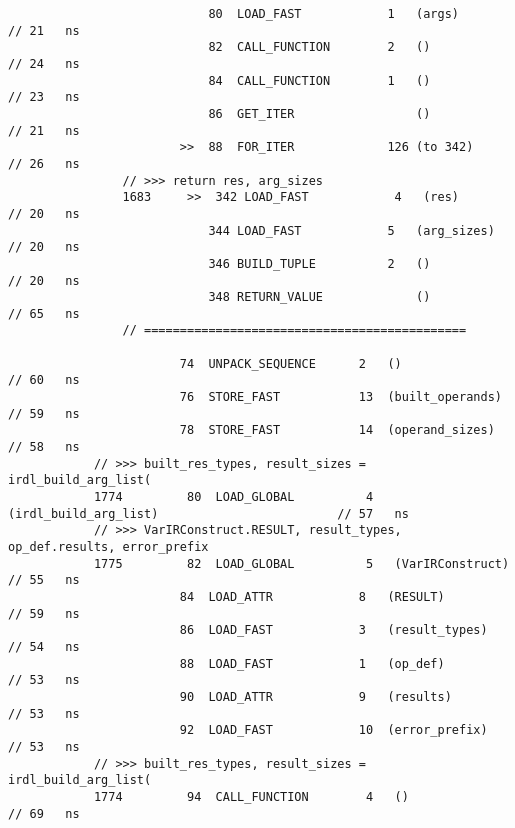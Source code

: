 \begin{code}
\begin{verbatim}
                            80  LOAD_FAST            1   (args)                                     // 21   ns
                            82  CALL_FUNCTION        2   ()                                         // 24   ns
                            84  CALL_FUNCTION        1   ()                                         // 23   ns
                            86  GET_ITER                 ()                                         // 21   ns
                        >>  88  FOR_ITER             126 (to 342)                                   // 26   ns
                // >>> return res, arg_sizes
                1683     >>  342 LOAD_FAST            4   (res)                                     // 20   ns
                            344 LOAD_FAST            5   (arg_sizes)                                // 20   ns
                            346 BUILD_TUPLE          2   ()                                         // 20   ns
                            348 RETURN_VALUE             ()                                         // 65   ns
                // =============================================

                        74  UNPACK_SEQUENCE      2   ()                                             // 60   ns
                        76  STORE_FAST           13  (built_operands)                               // 59   ns
                        78  STORE_FAST           14  (operand_sizes)                                // 58   ns
            // >>> built_res_types, result_sizes = irdl_build_arg_list(
            1774         80  LOAD_GLOBAL          4   (irdl_build_arg_list)                         // 57   ns
            // >>> VarIRConstruct.RESULT, result_types, op_def.results, error_prefix
            1775         82  LOAD_GLOBAL          5   (VarIRConstruct)                              // 55   ns
                        84  LOAD_ATTR            8   (RESULT)                                       // 59   ns
                        86  LOAD_FAST            3   (result_types)                                 // 54   ns
                        88  LOAD_FAST            1   (op_def)                                       // 53   ns
                        90  LOAD_ATTR            9   (results)                                      // 53   ns
                        92  LOAD_FAST            10  (error_prefix)                                 // 53   ns
            // >>> built_res_types, result_sizes = irdl_build_arg_list(
            1774         94  CALL_FUNCTION        4   ()                                            // 69   ns


\end{verbatim}
\end{code}
